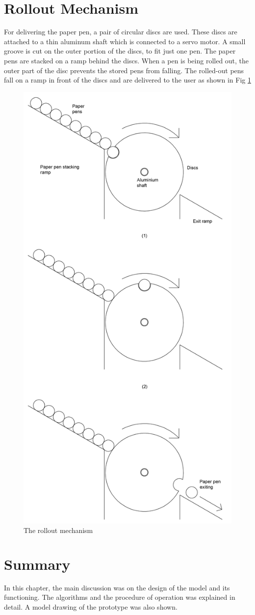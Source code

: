 \section{Rollout Mechanism}
For delivering the paper pen, a pair of circular discs are used. These discs are attached to a thin aluminum shaft which is connected to a servo motor. A small groove is cut on the outer portion of the discs, to fit just one pen. The paper pens are stacked on a ramp behind the discs. When a pen is being rolled out, the outer part of the disc prevents the stored pens from falling. The rolled-out pens fall on a ramp in front of the discs and are delivered to the user as shown in Fig \ref{rollout}

\begin{figure}[H]
	\centering
	\includegraphics[width=0.6\linewidth]{./picture-files/rollout.png}
	\caption{The rollout mechanism}
	\label{rollout}
\end{figure}   

\section{Summary}

In this chapter, the main discussion was on the design of the model and its functioning. The algorithms and the procedure of operation was explained in detail. A model drawing of the prototype was also shown.